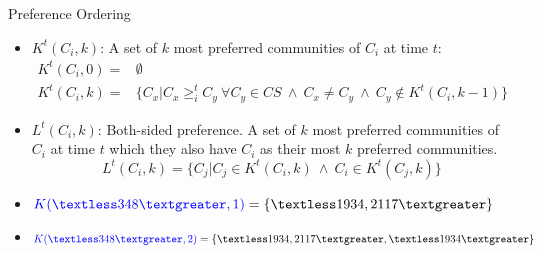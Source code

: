 \documentclass{beamer}
\begin{document}
\begin{frame}{Preference Ordering}
    \footnotesize
    \begin{itemize}
        \item {\color{blue}$K^t(C_i, k)$:} A set of $k$ most preferred communities of $C_i$ at time $t$:
            \footnotesize
            \begin{equation*}\label{h_t_pref_top}
                \begin{split}				
                    K^t(C_i, 0) = &\emptyset \\
                    K^t(C_i, k) = &\Big\{C_x | C_x \geq_{i}^t C_y ~\forall C_y \in CS ~\wedge~ C_x \neq C_y ~\wedge~ C_y \notin K^t(C_i, k-1) \Big\}				
                \end{split}
            \end{equation*}
        \item {\color{blue}$L^t(C_i,k)$:} Both-sided preference. A set of $k$ most preferred communities of $C_i$ at time $t$ which they also have $C_i$ as their most $k$ preferred communities.
            \footnotesize
            \begin{equation*}\label{l_t_top_both}
                L^t(C_i,k) = \Big\{C_j | C_j \in K^t(C_i, k)~ \wedge~ C_i \in K^t(C_j, k)\Big\}
            \end{equation*}
        
        \pause                      
        \item ${\color{blue}K(\textless 348 \textgreater, 1)} = \{\textless1934, 2117\textgreater\}$
        \item ${\color{blue}K(\textless 348 \textgreater, 2)} = \{\textless1934, 2117\textgreater, \textless1934\textgreater\}$

    \end{itemize}
\end{frame}
\end{document}

